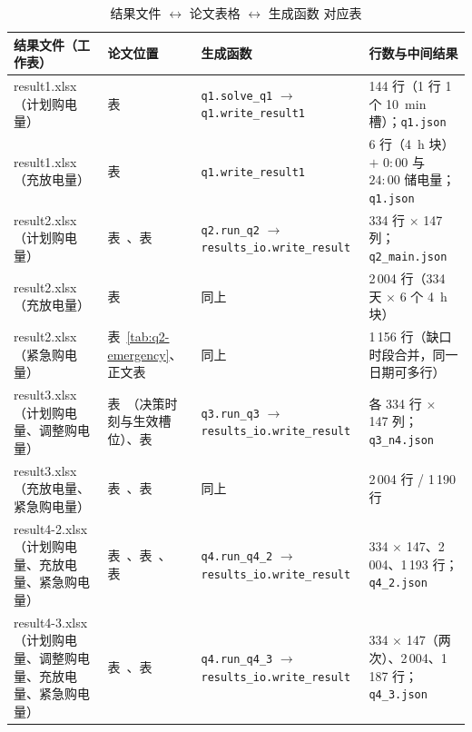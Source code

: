 \begin{table}[htbp]
  \centering
  \caption{结果文件 $\leftrightarrow$ 论文表格 $\leftrightarrow$ 生成函数 对应表}
  \label{tab:filemap}
  \footnotesize
  \setlength{\tabcolsep}{4pt}
  \begin{tabularx}{\linewidth}{L{3.4cm} L{2.4cm} L{4.0cm} Y}
    \toprule
    结果文件（工作表） & 论文位置 & 生成函数 & 行数与中间结果 \\
    \midrule
    result1.xlsx（计划购电量） & 表~
      & \texttt{q1.solve\_q1} $\rightarrow$ \texttt{q1.write\_result1}
      & 144 行（1 行 1 个 10~min 槽）；\texttt{q1.json} \\
    result1.xlsx（充放电量） & 表~
      & \texttt{q1.write\_result1}
      & 6 行（4~h 块）$+$ $0{:}00$ 与 $24{:}00$ 储电量；\texttt{q1.json} \\
    result2.xlsx（计划购电量） & 表~、表~
      & \texttt{q2.run\_q2} $\rightarrow$ \texttt{results\_io.write\_result}
      & 334 行 $\times$ 147 列；\texttt{q2\_main.json} \\
    result2.xlsx（充放电量） & 表~ & 同上
      & 2\,004 行（334 天 $\times$ 6 个 4~h 块） \\
    result2.xlsx（紧急购电量） & 表~\ref{tab:q2-emergency}、正文表~ & 同上
      & 1\,156 行（缺口时段合并，同一日期可多行） \\
    result3.xlsx（计划购电量、调整购电量） & 表~（决策时刻与生效槽位）、表~
      & \texttt{q3.run\_q3} $\rightarrow$ \texttt{results\_io.write\_result}
      & 各 334 行 $\times$ 147 列；\texttt{q3\_n4.json} \\
    result3.xlsx（充放电量、紧急购电量） & 表~、表~ & 同上
      & 2\,004 行 / 1\,190 行 \\
    result4-2.xlsx（计划购电量、充放电量、紧急购电量） & 表~、表~、表~
      & \texttt{q4.run\_q4\_2} $\rightarrow$ \texttt{results\_io.write\_result}
      & 334 $\times$ 147、2\,004、1\,193 行；\texttt{q4\_2.json} \\
    result4-3.xlsx（计划购电量、调整购电量、充放电量、紧急购电量） & 表~、表~
      & \texttt{q4.run\_q4\_3} $\rightarrow$ \texttt{results\_io.write\_result}
      & 334 $\times$ 147（两次）、2\,004、1\,187 行；\texttt{q4\_3.json} \\
    \bottomrule
  \end{tabularx}
\end{table}

